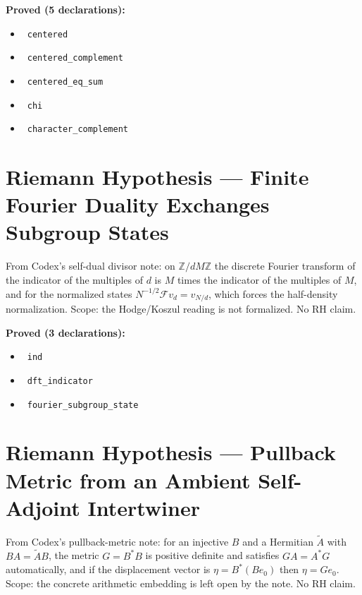 \documentclass{report}
\theoremstyle{definition}
\begin{document}
\noindent\textbf{Proved (5 declarations):}
\begin{itemize}
  \item {}\leanok\ \texttt{centered}
  \item {}\leanok\ \texttt{centered\_complement}
  \item {}\leanok\ \texttt{centered\_eq\_sum}
  \item {}\leanok\ \texttt{chi}
  \item {}\leanok\ \texttt{character\_complement}
\end{itemize}

\section{Riemann Hypothesis --- Finite Fourier Duality Exchanges Subgroup States}
From Codex's self-dual divisor note: on $\mathbb{Z}/dM\mathbb{Z}$ the discrete Fourier transform of the indicator of the multiples of $d$ is $M$ times the indicator of the multiples of $M$, and for the normalized states $N^{-1/2}\mathcal{F}v_d=v_{N/d}$, which forces the half-density normalization. Scope: the Hodge/Koszul reading is not formalized. No RH claim.

\noindent\textbf{Proved (3 declarations):}
\begin{itemize}
  \item {}\leanok\ \texttt{ind}
  \item {}\leanok\ \texttt{dft\_indicator}
  \item {}\leanok\ \texttt{fourier\_subgroup\_state}
\end{itemize}

\section{Riemann Hypothesis --- Pullback Metric from an Ambient Self-Adjoint Intertwiner}
From Codex's pullback-metric note: for an injective $B$ and a Hermitian $\tilde A$ with $BA=\tilde AB$, the metric $G=B^*B$ is positive definite and satisfies $GA=A^*G$ automatically, and if the displacement vector is $\eta=B^*(Be_0)$ then $\eta=Ge_0$. Scope: the concrete arithmetic embedding is left open by the note. No RH claim.
\end{document}
